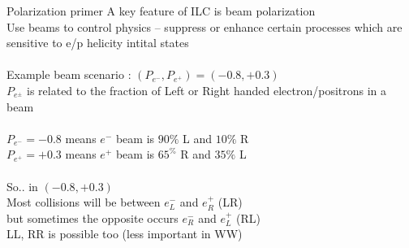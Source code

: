 \documentclass[10pt]{beamer}
\begin{document}
\begin{frame}{Polarization primer }
A key feature of ILC is beam polarization\\
Use beams to control physics -- suppress or enhance certain processes which are sensitive to e/p helicity intital states\\
\quad \quad \\ 

Example beam scenario : $(P_{e^-}, P_{e^+}) = (-0.8,+0.3)$\\
$P_{e^\pm}$ is related to the fraction of Left or Right handed electron/positrons in a beam\\
\quad \quad \\

$P_{e^-} =-0.8$ means $e^-$ beam is $90\%$ L and $10\%$ R\\
$P_{e^+} =+0.3$ means $e^+$ beam is $65^\%$ R and $35\%$ L\\
\quad \quad\\

So.. in $(-0.8,+0.3)$\\
Most collisions will be between $e^-_L$ and $e^+_R$ (LR)\\
but sometimes the opposite occurs $e^-_R$ and $e^+_L$ (RL)\\
LL, RR is possible too (less important in WW) \\


\end{frame}
\end{document}
